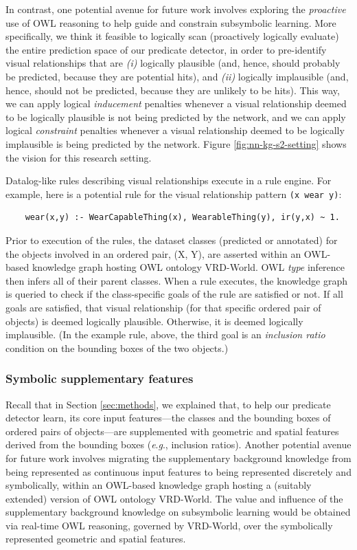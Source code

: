 \documentclass[]{jair}
\newcommand{\eg}{\textit{e}.\textit{g}.,\xspace}
\begin{document}
In contrast, one potential avenue for future work involves exploring the \emph{proactive} use of OWL reasoning to help guide and constrain subsymbolic learning.
More specifically, we think it feasible to logically scan (proactively logically evaluate) the entire prediction space of our predicate detector, in order to pre-identify visual relationships that are \textit{(i)} logically plausible (and, hence, should probably be predicted, because they are potential hits), and \textit{(ii)} logically implausible (and, hence, should not be predicted, because they are unlikely to be hits).
This way, we can apply logical \emph{inducement} penalties whenever a visual relationship deemed to be logically plausible is not being predicted by the network, and we can apply logical \emph{constraint} penalties whenever a visual relationship deemed to be logically implausible is being predicted by the network.
Figure \ref{fig:nn-kg-s2-setting} shows the vision for this research setting.

Datalog-like rules describing visual relationships execute in a rule engine.
For example, here is a potential rule for the visual relationship pattern \texttt{(x wear y)}:
\begin{verbatim}
    wear(x,y) :- WearCapableThing(x), WearableThing(y), ir(y,x) ~ 1.
\end{verbatim}
Prior to execution of the rules, the dataset classes (predicted or annotated) for the objects involved in an ordered pair, (X, Y), are asserted within an OWL-based knowledge graph hosting OWL ontology VRD-World.
OWL \emph{type} inference then infers all of their parent classes.
When a rule executes, the knowledge graph is queried to check if the class-specific goals of the rule are satisfied or not. 
If all goals are satisfied, that visual relationship (for that specific ordered pair of objects) is deemed logically plausible.
Otherwise, it is deemed logically implausible.
(In the example rule, above, the third goal is an \emph{inclusion ratio} condition on the bounding boxes of the two objects.)

\subsubsection{Symbolic supplementary features}
Recall that in Section \ref{sec:methods}, we explained that, to help our predicate detector learn, its core input features---the classes and the bounding boxes of ordered pairs of objects---are supplemented with geometric and spatial features derived from the bounding boxes (\eg inclusion ratios).
Another potential avenue for future work involves migrating the supplementary background knowledge from being represented as continuous input features to being represented discretely and symbolically, within an OWL-based knowledge graph hosting a (suitably extended) version of OWL ontology VRD-World.
The value and influence of the supplementary background knowledge on subsymbolic learning would be obtained via real-time OWL reasoning, governed by VRD-World, over the symbolically represented geometric and spatial features.
\end{document}
